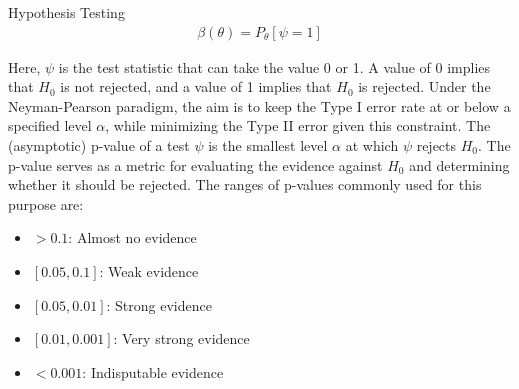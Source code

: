 \documentclass{beamer}
\begin{document}
\begin{frame}
\begin{columns}
\begin{column}{0.3\textwidth}
\begin{block}{Hypothesis Testing}
\begin{align*}
    \beta(\theta) = P_\theta[\psi = 1]
\end{align*}

Here, \(\psi\) is the test statistic that can take the value 0 or 1. A value of 0 implies that \(H_0\) is not rejected, and a value of 1 implies that \(H_0\) is rejected. Under the Neyman-Pearson paradigm, the aim is to keep the Type I error rate at or below a specified level \(\alpha\), while minimizing the Type II error given this constraint. The (asymptotic) p-value of a test \(\psi\) is the smallest level \(\alpha\) at which \(\psi\) rejects \(H_0\). The p-value serves as a metric for evaluating the evidence against \(H_0\) and determining whether it should be rejected. The ranges of p-values commonly used for this purpose are:

\begin{itemize}
    \item \(>0.1\): Almost no evidence
    \item \([0.05, 0.1]\): Weak evidence
    \item \([0.05, 0.01]\): Strong evidence
    \item \([0.01, 0.001]\): Very strong evidence
    \item \(<0.001\): Indisputable evidence
\end{itemize}

\end{block}

\end{column}

\end{columns}

\end{frame}
\end{document}

